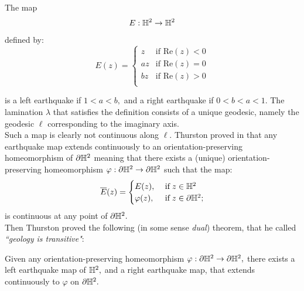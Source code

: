 \begin{example}\label{simplequake}
The map 
\[
    E:\mathbb{H}^2\to\mathbb{H}^2
\]
defined by:
\[
  E(z)= \begin{cases}
    z & \text{if Re}(z)<0 \\
    az & \text{if Re}(z)=0 \\
    bz & \text{if Re}(z)>0 \\    
\end{cases}
\]

is a left earthquake if $1<a<b,$ and a right earthquake if $0<b<a<1$. The lamination $\lambda$ that satisfies the definition consists of a unique geodesic, namely the geodesic $\ell$ corresponding to the imaginary axis. \\
Such a map is clearly not continuous along $\ell$.
Thurston proved in \cite{thurston1986earthquakes} that any earthquake map extends continuously to an orientation-preserving homeomorphism of $\partial\mathbb{H}^2$ meaning that there exists a (unique) orientation-preserving homeomorphism $\varphi:\partial\mathbb{H}^2\to\partial\mathbb{H}^2$ such that the map:
\[
    \overline{E}(z)=\begin{cases}
        E(z), &\text{ if}\; z\in \mathbb{H}^2\\
        \varphi(z), &\text{ if}\; z\in \partial\mathbb{H}^2  ;\\
        
    \end{cases}
\]
is continuous at any point of $\partial\mathbb{H}^2.$\\
Then Thurston proved the following (in some sense \textit{dual}) theorem, that he called \textit{``geology is transitive"}:

\begin{theorem}\label{earttheorem}
    Given any orientation-preserving homeomorphism $\varphi:\partial\mathbb{H}^2\to\partial\mathbb{H}^2,$ there exists a left earthquake map of $\mathbb{H}^2,$ and a right earthquake map, that extends continuously to $\varphi$ on $\partial\mathbb{H}^2.$
\end{theorem}
\end{example}


